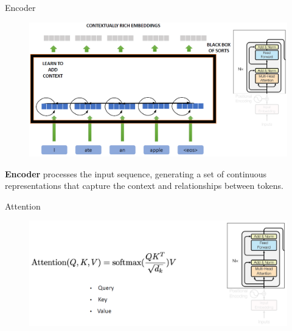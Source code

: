\begin{frame}{Encoder}
    \begin{figure}
        \centering
        \includegraphics[width=\linewidth, height=0.9\textheight,keepaspectratio]{images/nlp/encoder.png}
    \end{figure}

    \textbf{Encoder} processes the input sequence, generating a set of continuous representations that capture the context and relationships between tokens.
\end{frame}

\begin{frame}{Attention}
    \begin{figure}
        \centering
        \includegraphics[width=\linewidth, height=0.9\textheight,keepaspectratio]{images/nlp/attention.png}
    \end{figure}
\end{frame}

